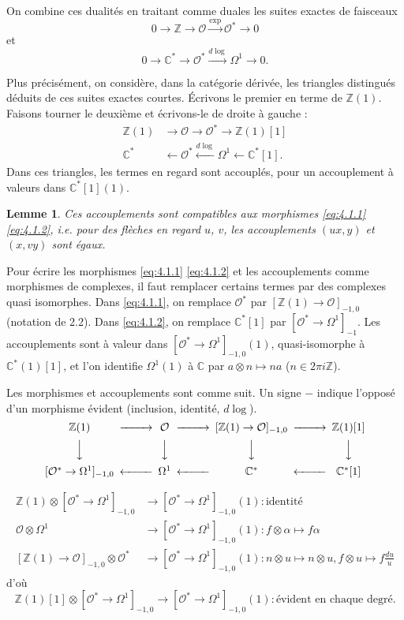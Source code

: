 \documentclass[12pt,a4paper]{article}
\theoremstyle{plain}
\newtheorem{lemma}[theorem]{Lemme}
\theoremstyle{definition}
\theoremstyle{remark}
\newcommand{\cO}{\mathcal{O}}
\newcommand{\Z}{\mathbb{Z}}
\newcommand{\C}{\mathbb{C}}
\providecommand{\cO}{\mathcal{O}}
\begin{document}
On combine ces dualités en traitant comme duales les suites exactes de faisceaux
\[
0 \to \Z \to \cO \xrightarrow{\exp} \cO^* \to 0
\]
et
\[
0 \to \C^* \to \cO^* \xrightarrow{d\log} \Omega^1 \to 0.
\]

Plus précisément, on considère, dans la catégorie dérivée, les triangles distingués
déduits de ces suites exactes courtes. Écrivons le premier en terme de $\Z(1)$. Faisons
tourner le deuxième et écrivons-le de droite à gauche :
\begin{align}
\Z(1) &\to \cO \to \cO^* \to \Z(1)[1] \label{eq:4.1.1} \\
\C^* &\leftarrow \cO^* \xleftarrow{d\log} \Omega^1 \leftarrow \C^*[1]. \label{eq:4.1.2}
\end{align}
Dans ces triangles, les termes en regard sont accouplés, pour un accouplement
à valeurs dans $\C^*[1](1)$.

\begin{lemma}
Ces accouplements sont compatibles aux morphismes \eqref{eq:4.1.1} \eqref{eq:4.1.2},
i.e. pour des flèches en regard $u$, $v$, les accouplements $(ux, y)$ et $(x, vy)$ sont égaux.
\end{lemma}

Pour écrire les morphismes \eqref{eq:4.1.1} \eqref{eq:4.1.2} et les accouplements comme morphismes
de complexes, il faut remplacer certains termes par des complexes quasi isomorphes.
Dans \eqref{eq:4.1.1}, on remplace $\cO^*$ par $[\Z(1) \to \cO]_{-1,0}$ (notation de 2.2). Dans \eqref{eq:4.1.2}, on
remplace $\C^*[1]$ par $[\cO^* \to \Omega^1]_{-1}$. Les accouplements sont à valeur dans $[\cO^* \to \Omega^1]_{-1,0}(1)$,
quasi-isomorphe à $\C^*(1)[1]$, et l'on identifie $\Omega^1(1)$ à $\C$ par $a \otimes n \mapsto na$ ($n \in 2\pi i\Z$).

Les morphismes et accouplements sont comme suit. Un signe $-$ indique l'opposé d'un
morphisme évident (inclusion, identité, $d\log$).
\[
\begin{CD}
\Z(1) @>>> \cO @>>> [\Z(1) \to \cO]_{-1,0} @>>> \Z(1)[1] \\
@VVV @VVV @VVV @VVV \\
[\cO^* \to \Omega^1]_{-1,0} @<<< \Omega^1 @<<< \C^* @<<< \C^*[1]
\end{CD}
\]

\begin{align*}
\Z(1) \otimes [\cO^* \to \Omega^1]_{-1,0} &\to [\cO^* \to \Omega^1]_{-1,0}(1) : \text{identité} \\
\cO \otimes \Omega^1 &\to [\cO^* \to \Omega^1]_{-1,0}(1) : f \otimes \alpha \mapsto f\alpha \\
[\Z(1) \to \cO]_{-1,0} \otimes \cO^* &\to [\cO^* \to \Omega^1]_{-1,0}(1) : n \otimes u \mapsto n \otimes u, f \otimes u \mapsto f \frac{du}{u}
\end{align*}
d'où
\[
\Z(1)[1] \otimes [\cO^* \to \Omega^1]_{-1,0} \to [\cO^* \to \Omega^1]_{-1,0}(1) : \text{évident en chaque degré}.
\]
\end{document}
